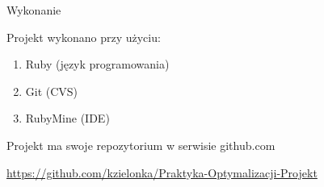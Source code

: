 \begin{frame}{Wykonanie}

	\begin{block}{}
	Projekt wykonano przy użyciu:
	\end{block}
	\begin{enumerate}
		\item Ruby (język programowania)
		\item Git (CVS)
		\item RubyMine (IDE)
	\end{enumerate}
	\begin{block}{}
	Projekt ma swoje repozytorium w serwisie github.com
	
	\url{https://github.com/kzielonka/Praktyka-Optymalizacji-Projekt}
	\end{block}
	

\end{frame}
